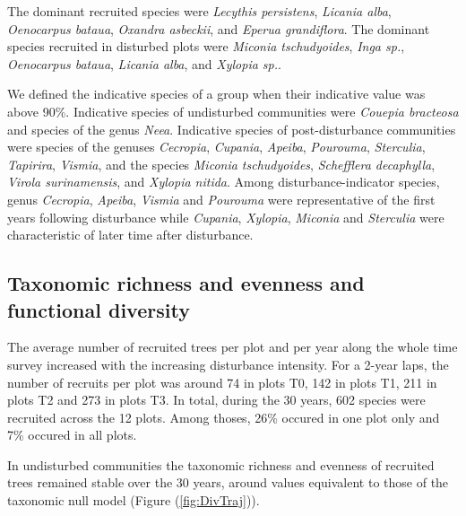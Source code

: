 \documentclass[fleqn,10pt]{ArtEcoFoG} %
\begin{document}
The dominant recruited species were \emph{Lecythis persistens},
\emph{Licania alba}, \emph{Oenocarpus bataua}, \emph{Oxandra asbeckii},
and \emph{Eperua grandiflora}. The dominant species recruited in
disturbed plots were \emph{Miconia tschudyoides}, \emph{Inga sp.},
\emph{Oenocarpus bataua}, \emph{Licania alba}, and \emph{Xylopia sp.}.

We defined the indicative species of a group when their indicative value
was above 90\%. Indicative species of undisturbed communities were
\emph{Couepia bracteosa} and species of the genus \emph{Neea}.
Indicative species of post-disturbance communities were species of the
genuses \emph{Cecropia}, \emph{Cupania}, \emph{Apeiba}, \emph{Pourouma},
\emph{Sterculia}, \emph{Tapirira}, \emph{Vismia}, and the species
\emph{Miconia tschudyoides}, \emph{Schefflera decaphylla}, \emph{Virola
surinamensis}, and \emph{Xylopia nitida}. Among disturbance-indicator
species, genus \emph{Cecropia}, \emph{Apeiba}, \emph{Vismia} and
\emph{Pourouma} were representative of the first years following
disturbance while \emph{Cupania}, \emph{Xylopia}, \emph{Miconia} and
\emph{Sterculia} were characteristic of later time after disturbance.
\color{black}

\subsection{Taxonomic richness and evenness and functional
diversity}\label{taxonomic-richness-and-evenness-and-functional-diversity}

\color{red} The average number of recruited trees per plot and per year
along the whole time survey increased with the increasing disturbance
intensity. For a 2-year laps, the number of recruits per plot was around
74 in plots T0, 142 in plots T1, 211 in plots T2 and 273 in plots T3. In
total, during the 30 years, 602 species were recruited across the 12
plots. Among thoses, 26\% occured in one plot only and 7\% occured in
all plots. \color{black}

In undisturbed communities the taxonomic richness and evenness of
recruited trees remained stable over the 30 years, around values
equivalent to those of the taxonomic null model (Figure
(\ref{fig:DivTraj})).
\end{document}
